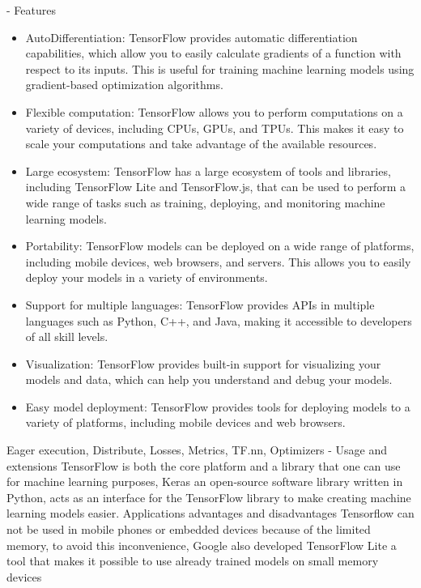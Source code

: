 - Features
\begin{itemize}
	\item AutoDifferentiation: TensorFlow provides automatic differentiation capabilities, which allow you to easily calculate gradients of a function with respect to its inputs. This is useful for training machine learning models using gradient-based optimization algorithms.
	\item Flexible computation: TensorFlow allows you to perform computations on a variety of devices, including CPUs, GPUs, and TPUs. This makes it easy to scale your computations and take advantage of the available resources.
	\item Large ecosystem: TensorFlow has a large ecosystem of tools and libraries, including TensorFlow Lite and TensorFlow.js, that can be used to perform a wide range of tasks such as training, deploying, and monitoring machine learning models.
	\item Portability: TensorFlow models can be deployed on a wide range of platforms, including mobile devices, web browsers, and servers. This allows you to easily deploy your models in a variety of environments.
	\item Support for multiple languages: TensorFlow provides APIs in multiple languages such as Python, C++, and Java, making it accessible to developers of all skill levels.
	\item Visualization: TensorFlow provides built-in support for visualizing your models and data, which can help you understand and debug your models.
	\item Easy model deployment: TensorFlow provides tools for deploying models to a variety of platforms, including mobile devices and web browsers.
\end{itemize}

Eager execution, Distribute, Losses, Metrics, TF.nn, Optimizers
- Usage and extensions
TensorFlow is both the core platform and a library that one can use for machine learning purposes, Keras an open-source software library written in Python, acts as an interface for the TensorFlow library to make creating machine learning models easier.
Applications
advantages and disadvantages 
Tensorflow can not be used in mobile phones or embedded devices because of the limited memory, 
to avoid this inconvenience, Google also developed TensorFlow Lite a tool that makes it possible to use already trained models on small memory devices 
